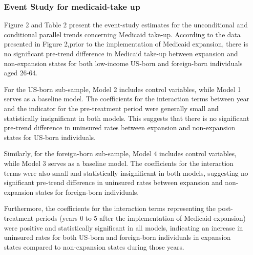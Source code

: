 \documentclass[
]{article}
\begin{document}
\hypertarget{event-study-for-medicaid-take-up}{%
\subsubsection{Event Study for medicaid-take
up}\label{event-study-for-medicaid-take-up}}

Figure 2 and Table 2 present the event-study estimates for the
unconditional and conditional parallel trends concerning Medicaid
take-up. According to the data presented in Figure 2,prior to the
implementation of Medicaid expansion, there is no significant pre-trend
difference in Medicaid take-up between expansion and non-expansion
states for both low-income US-born and foreign-born individuals aged
26-64.

For the US-born sub-sample, Model 2 includes control variables, while
Model 1 serves as a baseline model. The coefficients for the interaction
terms between year and the indicator for the pre-treatment period were
generally small and statistically insignificant in both models. This
suggests that there is no significant pre-trend difference in uninsured
rates between expansion and non-expansion states for US-born
individuals.

Similarly, for the foreign-born sub-sample, Model 4 includes control
variables, while Model 3 serves as a baseline model. The coefficients
for the interaction terms were also small and statistically
insignificant in both models, suggesting no significant pre-trend
difference in uninsured rates between expansion and non-expansion states
for foreign-born individuals.

Furthermore, the coefficients for the interaction terms representing the
post-treatment periods (years 0 to 5 after the implementation of
Medicaid expansion) were positive and statistically significant in all
models, indicating an increase in uninsured rates for both US-born and
foreign-born individuals in expansion states compared to non-expansion
states during those years.
\end{document}
